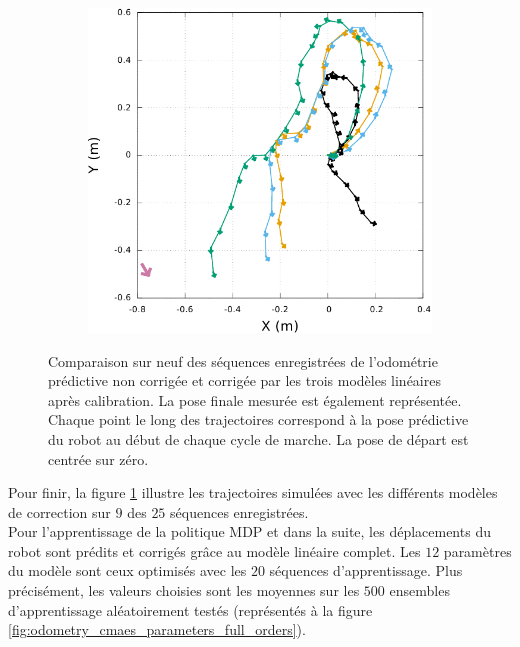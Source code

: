 \begin{figure}[htb]
\begin{subfigure}{0.28\paperwidth}
    \end{subfigure}
    \begin{subfigure}{0.28\paperwidth}
        \centering
        \includegraphics[type=pdf,ext=.pdf,read=.pdf,width=1.0\linewidth]{../plot/OdometryCMAES/ordersTraj9}
    \end{subfigure}
    \caption{\label{fig:odometry_cmaes_trajs_orders} 
        Comparaison sur neuf des séquences enregistrées de l'odométrie prédictive non
        corrigée et corrigée par les trois modèles linéaires après calibration.
        La pose finale mesurée est également représentée.
        Chaque point le long des trajectoires correspond à la pose prédictive du robot 
        au début de chaque cycle de marche.
        La pose de départ est centrée sur zéro.
    }
\end{figure}

Pour finir, la figure \ref{fig:odometry_cmaes_trajs_orders} illustre les trajectoires
simulées avec les différents modèles de correction sur $9$ des $25$ 
séquences enregistrées.\\

Pour l'apprentissage de la politique MDP et dans la suite, 
les déplacements du robot sont prédits et corrigés grâce 
au modèle linéaire complet.
Les $12$ paramètres du modèle sont ceux optimisés avec les $20$ séquences d'apprentissage.
Plus précisément, les valeurs choisies sont les moyennes
sur les $500$ ensembles d'apprentissage aléatoirement testés 
(représentés à la figure \ref{fig:odometry_cmaes_parameters_full_orders}).

